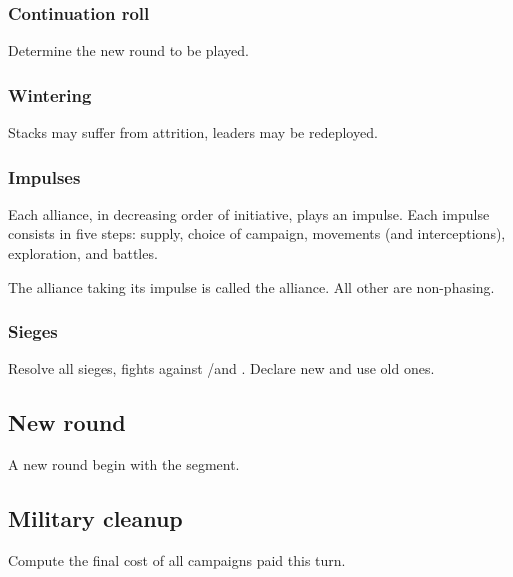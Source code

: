 \subsubsection{Continuation roll}
Determine the new round to be played.

\subsubsection{Wintering}
Stacks may suffer from attrition, leaders may be redeployed.

\subsubsection{Impulses}
Each alliance, in decreasing order of initiative, plays an impulse. Each
impulse consists in five steps: supply, choice of campaign, movements (and
interceptions), exploration, and battles.

The alliance taking its impulse is called the  alliance. All
other are non-phasing.

\subsubsection{Sieges}
Resolve all sieges, fights against \REVOLT/\REBELLION and \corsaire. Declare
new  and use old ones.

\subsection{New round}
A new round begin with the  segment.

\subsection{Military cleanup}
Compute the final cost of all campaigns paid this turn.

